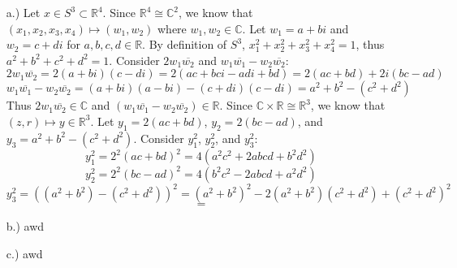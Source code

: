 \documentclass[11pt]{article}
\newcommand{\p}[1]{\left(#1\right)}             %
\newcommand{\R}{\mathbb{R}}
\newcommand{\C}{\mathbb{C}}
\begin{document}
\pagestyle{fancy}
\fancyhead{}

\normalsize

\begin{itemize}
    \item [a.)] Let $x\in S^3\subset\R^4$. Since $\R^4\cong\C^2$, we know that $(x_1,x_2,x_3,x_4)\mapsto(w_1,w_2)$ where $w_1,w_2\in\C$. Let $w_1=a+bi$ and $w_2=c+di$ for $a,b,c,d\in\R$. By definition of $S^3$, $x_1^2+x_2^2+x_3^2+x_4^2=1$, thus $a^2+b^2+c^2+d^2=1$. Consider $2w_1\overline{w_2}$ and $w_1\overline{w_1}-w_2\overline{w_2}$:
    \[2w_1\overline{w_2}=2(a+bi)(c-di)=2(ac+bci-adi+bd)=2(ac+bd)+2i(bc-ad)\]
    \[w_1\overline{w_1}-w_2\overline{w_2}=(a+bi)(a-bi)-(c+di)(c-di)=a^2+b^2-\p{c^2+d^2}\]
    Thus $2w_1\overline{w_2}\in\C$ and $(w_1\overline{w_1}-w_2\overline{w_2})\in\R$. Since $\C\times\R\cong\R^3$, we know that $(z,r)\mapsto y\in\R^3$. Let $y_1=2(ac+bd)$, $y_2=2(bc-ad)$, and $y_3=a^2+b^2-\p{c^2+d^2}$. Consider $y_1^2$, $y_2^2$, and $y_3^2$:
    \[y_1^2=2^2(ac+bd)^2=4\p{a^2c^2+2abcd+b^2d^2}\]
    \[y_2^2=2^2(bc-ad)^2=4\p{b^2c^2-2abcd+a^2d^2}\]
    \[y_3^2=\p{\p{a^2+b^2}-\p{c^2+d^2}}^2=\p{a^2+b^2}^2-2\p{a^2+b^2}\p{c^2+d^2}+\p{c^2+d^2}^2\]
    \[=\]

    \item [b.)] awd
    
    \item [c.)] awd
\end{itemize}
\end{document}
